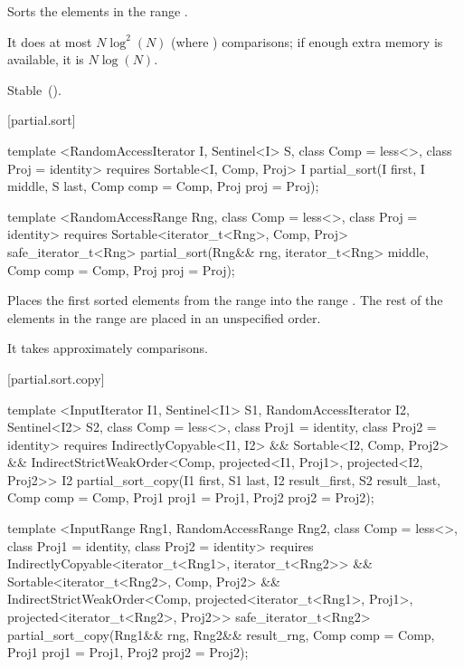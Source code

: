 \begin{itemdescr}
\pnum
\effects
Sorts the elements in the range .

\pnum
\complexity
It does at most $N \log^2(N)$
(where
)
comparisons; if enough extra memory is available, it is
$N \log(N)$.

\pnum
\remarks Stable~().
\end{itemdescr}

[partial.sort]{}

%
\begin{itemdecl}
template <RandomAccessIterator I, Sentinel<I> S, class Comp = less<>,
    class Proj = identity>
  requires Sortable<I, Comp, Proj>
  I partial_sort(I first, I middle, S last, Comp comp = Comp{}, Proj proj = Proj{});

template <RandomAccessRange Rng, class Comp = less<>, class Proj = identity>
  requires Sortable<iterator_t<Rng>, Comp, Proj>
  safe_iterator_t<Rng>
    partial_sort(Rng&& rng, iterator_t<Rng> middle, Comp comp = Comp{},
                 Proj proj = Proj{});
\end{itemdecl}

\begin{itemdescr}
\pnum
\effects
Places the first
sorted elements from the range
into the range
.
The rest of the elements in the range
are placed in an unspecified order.
%

\pnum
\complexity
It takes approximately
comparisons.
\end{itemdescr}

[partial.sort.copy]{}

%
\begin{itemdecl}
template <InputIterator I1, Sentinel<I1> S1, RandomAccessIterator I2, Sentinel<I2> S2,
    class Comp = less<>, class Proj1 = identity, class Proj2 = identity>
  requires IndirectlyCopyable<I1, I2> && Sortable<I2, Comp, Proj2> &&
      IndirectStrictWeakOrder<Comp, projected<I1, Proj1>, projected<I2, Proj2>>
  I2
    partial_sort_copy(I1 first, S1 last, I2 result_first, S2 result_last,
                      Comp comp = Comp{}, Proj1 proj1 = Proj1{}, Proj2 proj2 = Proj2{});

template <InputRange Rng1, RandomAccessRange Rng2, class Comp = less<>,
    class Proj1 = identity, class Proj2 = identity>
  requires IndirectlyCopyable<iterator_t<Rng1>, iterator_t<Rng2>> &&
      Sortable<iterator_t<Rng2>, Comp, Proj2> &&
      IndirectStrictWeakOrder<Comp, projected<iterator_t<Rng1>, Proj1>,
        projected<iterator_t<Rng2>, Proj2>>
  safe_iterator_t<Rng2>
    partial_sort_copy(Rng1&& rng, Rng2&& result_rng, Comp comp = Comp{},
                      Proj1 proj1 = Proj1{}, Proj2 proj2 = Proj2{});
\end{itemdecl}

